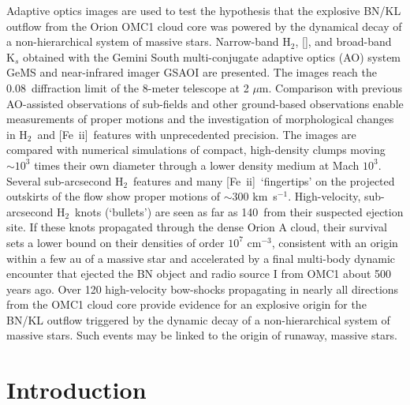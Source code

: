 \documentclass{aa}
\newcommand{\cmq}{cm{$^{-3}$}}
\newcommand{\kms}{km~s{$^{-1}$}}
\newcommand{\Feii}{[Fe~{\sc ii}]}
\newcommand{\mum}{\ensuremath{\mu \mathrm{m}}}
\newcommand{\hh}{\ensuremath{\textrm{H}_{2}}}			%
\newcommand{\feii}{\ion{Fe}{2}}		%
\begin{document}
\abstract
{}
{Adaptive optics images are used to test the hypothesis
that the explosive  BN/KL outflow from the Orion OMC1 cloud 
core was powered by the dynamical decay of a non-hierarchical
system of massive stars.  }
{
Narrow-band \hh ,  [\feii], and broad-band K$_s$ obtained with the Gemini 
South multi-conjugate adaptive optics (AO) system GeMS and near-infrared 
imager GSAOI are presented.   
The images reach the 0.08\arcsec\ diffraction limit of the 8-meter 
telescope at 2 \mum.  Comparison with previous AO-assisted observations of 
sub-fields and other ground-based observations enable measurements of proper 
motions and the investigation of morphological changes in  \hh\ and \Feii\ features 
with  unprecedented precision.   The images are compared with numerical simulations of 
compact, high-density clumps moving $\sim 10^3$ times their own
diameter through a lower density medium at Mach $10^3$. 
}
{
Several sub-arcsecond \hh\ features and many \Feii\ `fingertips' on the 
projected outskirts of the flow show 
proper motions of $\sim$300 \kms.    High-velocity,  
sub-arcsecond   \hh\  knots (`bullets')  
are seen as far as 140\arcsec\ from their suspected ejection site.    
If these knots propagated through the dense  Orion A 
cloud, their survival  sets  a lower bound on their densities of order $10^7$ \cmq ,  
consistent with an origin within a few au of a massive star and accelerated
by a final multi-body dynamic encounter  that ejected  
the BN  object and radio source I from OMC1 about 500 years ago.  
}
{
Over 120 high-velocity bow-shocks propagating in nearly all 
directions from the OMC1 cloud core provide evidence for an explosive 
origin for the BN/KL outflow triggered by the dynamic decay of a non-hierarchical
system of massive stars.   Such events may be linked to the origin of 
runaway, massive stars. 
}

\maketitle

\section{Introduction} 
\end{document}
